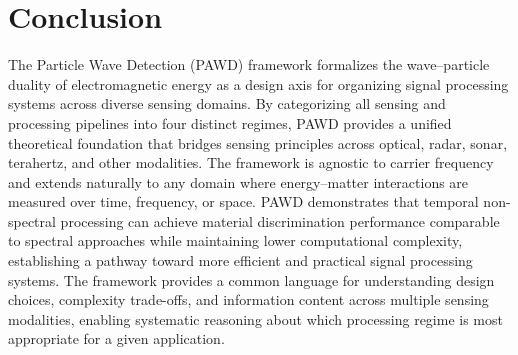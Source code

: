 \documentclass[11pt]{article}
\begin{document}
\section{Conclusion}

The Particle Wave Detection (PAWD) framework formalizes the wave--particle duality of electromagnetic energy as a design axis for organizing signal processing systems across diverse sensing domains. By categorizing all sensing and processing pipelines into four distinct regimes, PAWD provides a unified theoretical foundation that bridges sensing principles across optical, radar, sonar, terahertz, and other modalities. The framework is agnostic to carrier frequency and extends naturally to any domain where energy--matter interactions are measured over time, frequency, or space. PAWD demonstrates that temporal non-spectral processing can achieve material discrimination performance comparable to spectral approaches while maintaining lower computational complexity, establishing a pathway toward more efficient and practical signal processing systems. The framework provides a common language for understanding design choices, complexity trade-offs, and information content across multiple sensing modalities, enabling systematic reasoning about which processing regime is most appropriate for a given application.



\end{document}
